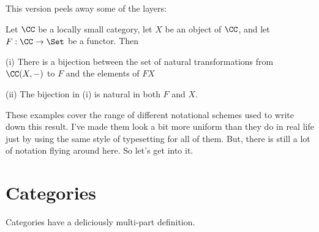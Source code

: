 \documentclass[12pt]{article}
\begin{document}
\noindent
This version peels away some of the layers:

\begin{lemma}[Yoneda]\label{yoneda6}
Let $\CC$ be a locally small category, let $X$ be an object of $\CC$, and let $F: \CC \to \Set$ be a functor. Then

(i) There is a bijection between the set of natural transformations from $\CC(X, -)$ to $F$ and the elements of $FX$

(ii) The bijection in (i) is natural in both $F$ and $X$.
\end{lemma}

\noindent
These examples cover the range of different notational schemes used to write down this result. I've made them look a bit more uniform than they do in real life just by using the same style of typesetting for all of them. But, there is still a lot of notation flying around here. So let's get into it.

\section{Categories}

Categories have a deliciously multi-part definition.
\end{document}
